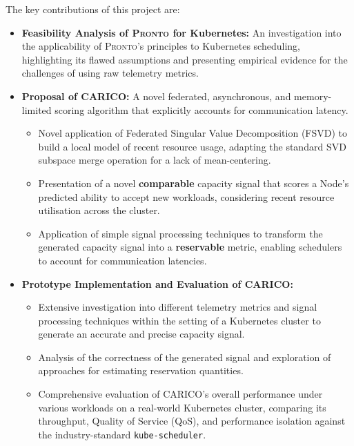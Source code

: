 The key contributions of this project are:
\begin{itemize}
    \item \textbf{Feasibility Analysis of \textsc{Pronto} for Kubernetes:} An
        investigation into the applicability of \textsc{Pronto}'s principles to
        Kubernetes scheduling, highlighting its flawed assumptions and
        presenting empirical evidence for the challenges of using raw telemetry
        metrics.
    \item \textbf{Proposal of \textsc{CARICO}:} A novel federated, asynchronous,
        and memory-limited scoring algorithm that explicitly accounts for
        communication latency.
    \begin{itemize}
        \item Novel application of Federated Singular Value Decomposition (FSVD)
            to build a local model of recent resource usage, adapting the
            standard SVD subspace merge operation for a lack of mean-centering.
        \item Presentation of a novel \textbf{comparable} capacity signal that scores a Node's
            predicted ability to accept new workloads, considering recent
            resource utilisation across the cluster.
        \item Application of simple signal processing techniques to transform
            the generated capacity signal into a \textbf{reservable} metric,
            enabling schedulers to account for communication latencies.
    \end{itemize}
    \item \textbf{Prototype Implementation and Evaluation of \textsc{CARICO}:}
    \begin{itemize}
        \item Extensive investigation into different telemetry metrics and
            signal processing techniques within the setting of a Kubernetes
            cluster to generate an accurate and precise capacity signal.
        \item Analysis of the correctness of the generated signal and
            exploration of approaches for estimating reservation quantities.
        \item Comprehensive evaluation of \textsc{CARICO}'s overall performance
            under various workloads on a real-world Kubernetes cluster,
            comparing its throughput, Quality of Service (QoS), and performance
            isolation against the industry-standard \texttt{kube-scheduler}.
    \end{itemize}
\end{itemize}

